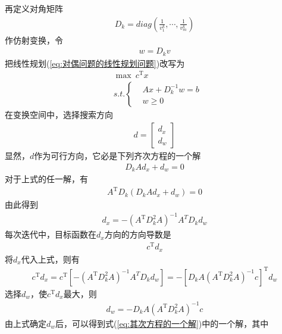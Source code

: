         再定义对角矩阵
        \begin{align*}
         D_k = diag \left( \frac{1}{v_1^k},\cdots,\frac{1}{v_m^k} \right)
        \end{align*}
        作仿射变换，令
        \begin{align*}
         w = D_kv
        \end{align*}
        把线性规划(\ref{eq:对偶问题的线性规划问题})改写为
        \begin{align*}
        &\mathop {\max}\  c^\mathrm{T} x\\
        &s.t.\left\{
        \begin{aligned}
        & Ax+D_k^{-1}w = b\\
        & w \geqslant 0
        \end{aligned}
        \right.
        \end{align*}
        在变换空间中，选择搜索方向
        \begin{align*}
         d = \begin{bmatrix}d_x\\d_w\end{bmatrix}
        \end{align*}
        显然，$d$作为可行方向，它必是下列齐次方程的一个解
        \begin{align}
        \label{eq:其次方程的一个解}
         D_kAd_x+d_w=0
        \end{align}
        对于上式的任一解，有
        \begin{align*}
         A^\mathrm{T} D_k(D_kAd_x+d_w)=0
        \end{align*}
        由此得到
        \begin{align*}
         d_x=-(A^\mathrm{T} D_k^2A)^{-1}A^{T}D_kd_w
        \end{align*}
        每次迭代中，目标函数在$d_x$方向的方向导数是
        \begin{align*}
         c^\mathrm{T} d_x
        \end{align*}
        将$d_x$代入上式，则有
        \begin{align*}
         c^\mathrm{T} d_x=c^\mathrm{T} [-(A^\mathrm{T} D_k^2A)^{-1}A^{T}D_kd_w]=-[D_kA(A^\mathrm{T} D_k^2A)^{-1}c]^\mathrm{T} d_w
        \end{align*}
        选择$d_w$，使$c^\mathrm{T} d_x$最大，则
        \begin{align*}
         d_w=-D_kA(A^\mathrm{T} D_k^2A)^{-1}c
        \end{align*}
        由上式确定$d_w$后，可以得到式(\ref{eq:其次方程的一个解})中的一个解，其中
